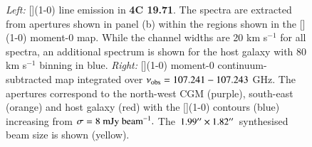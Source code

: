\begin{figure}
\hspace*{-50pt}
\centering
{}
  \caption[{4C 19.71 [](1-0) line spectra and moment-0 maps}]{{\it Left:} [](1-0) line emission in {\bf 4C 19.71}. The spectra are extracted from apertures shown in panel (b) within the regions shown in the [](1-0) moment-0 map. While the channel widths are 20 km s$^{-1}$ for all spectra, an additional spectrum is shown for the host galaxy with 80 km s$^{-1}$ binning in blue. {\it Right:} [](1-0) moment-0 continuum-subtracted map integrated over $\nu_{\rm obs}=107.241-107.243$ GHz. The apertures correspond to the north-west CGM (purple), south-east (orange) and host galaxy (red) with the [](1-0) contours (blue) increasing from $\sigma=8~\rm{mJy~beam}^{-1}.$ The $1.99^{\prime\prime} \times 1.82^{\prime\prime}$ synthesised beam size is shown (yellow).}
  \label{fig:4C19-fit-CI-moment0}
\end{figure}

